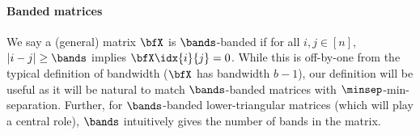 \paragraph{Banded matrices}
We say a (general) matrix $\bfX$ is $\bands$-banded if for all $i,j \in [n]$, $|i -j| \ge \bands$ implies $\bfX\idx{i}{j} = 0$. While this is off-by-one from the typical definition of bandwidth ($\bfX$ has bandwidth $b-1$), our definition will be useful as it will be natural to match $\bands$-banded matrices with $\minsep$-min-separation. Further, for $\bands$-banded lower-triangular matrices (which will play a central role), $\bands$ intuitively gives the number of bands in the matrix.  



